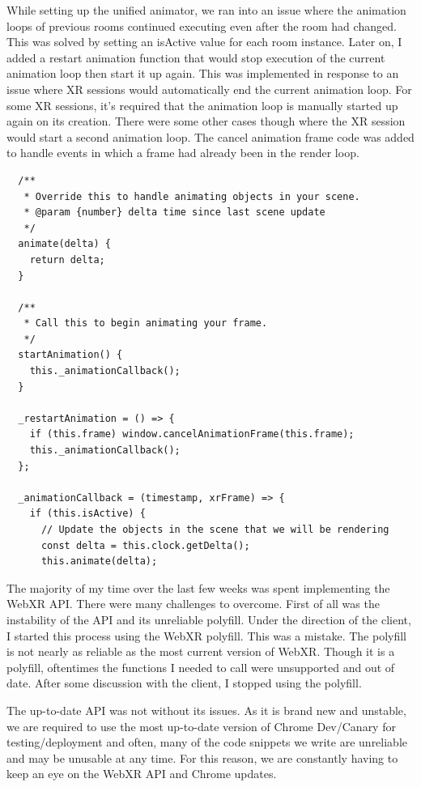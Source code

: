 \documentclass[onecolumn, draftclsnofoot,10pt, compsoc]{IEEEtran}
\begin{document}
    While setting up the unified animator, we ran into an issue where the animation loops of previous rooms continued executing even after the room had changed. This was solved by setting an isActive value for each room instance. Later on, I added a restart animation function that would stop execution of the current animation loop then start it up again. This was implemented in response to an issue where XR sessions would automatically end the current animation loop. For some XR sessions, it's required that the animation loop is manually started up again on its creation. There were some other cases though where the XR session would start a second animation loop. The cancel animation frame code was added to handle events in which a frame had already been in the render loop.
    \begin{lstlisting}
  /**
   * Override this to handle animating objects in your scene.
   * @param {number} delta time since last scene update
   */
  animate(delta) {
    return delta;
  }

  /**
   * Call this to begin animating your frame.
   */
  startAnimation() {
    this._animationCallback();
  }

  _restartAnimation = () => {
    if (this.frame) window.cancelAnimationFrame(this.frame);
    this._animationCallback();
  };

  _animationCallback = (timestamp, xrFrame) => {
    if (this.isActive) {
      // Update the objects in the scene that we will be rendering
      const delta = this.clock.getDelta();
      this.animate(delta);
    \end{lstlisting}
    
    The majority of my time over the last few weeks was spent implementing the WebXR API. There were many challenges to overcome. First of all was the instability of the API and its unreliable polyfill. Under the direction of the client, I started this process using the WebXR polyfill. This was a mistake. The polyfill is not nearly as reliable as the most current version of WebXR. Though it is a polyfill, oftentimes the functions I needed to call were unsupported and out of date. After some discussion with the client, I stopped using the polyfill.
    
    The up-to-date API was not without its issues. As it is brand new and unstable, we are required to use the most up-to-date version of Chrome Dev/Canary for testing/deployment and often, many of the code snippets we write are unreliable and may be unusable at any time. For this reason, we are constantly having to keep an eye on the WebXR API and Chrome updates.
    
\end{document}
